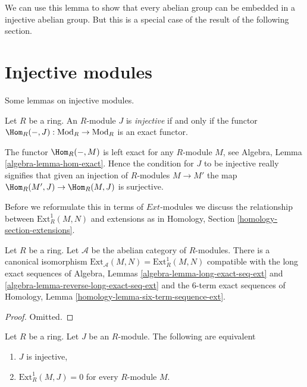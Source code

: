 \noindent
We can use this lemma to show that every abelian
group can be embedded in a injective abelian
group. But this is a special case of the result of
the following section.





\section{Injective modules}
\label{section-injectives-modules}

\noindent
Some lemmas on injective modules.

\begin{definition}
\label{definition-projective}
Let $R$ be a ring. An $R$-module $J$ is {\it injective} if and only if
the functor $\Hom_R(-, J) : \text{Mod}_R \to \text{Mod}_R$ is
an exact functor.
\end{definition}

\noindent
The functor $\Hom_R(- , M)$ is left exact for any $R$-module $M$, see
Algebra, Lemma \ref{algebra-lemma-hom-exact}.
Hence the condition for $J$ to be injective really signifies that given
an injection of $R$-modules $M \to M'$ the map
$\Hom_R(M', J) \to \Hom_R(M, J)$ is surjective.

\medskip\noindent
Before we reformulate this in terms of ${Ext}$-modules we discuss the
relationship between $\text{Ext}^1_R(M, N)$ and extensions as in
Homology, Section \ref{homology-section-extensions}.

\begin{lemma}
\label{lemma-relation-ext-ext}
Let $R$ be a ring. Let $\mathcal{A}$ be the abelian category of
$R$-modules. There is a canonical isomorphism
$\text{Ext}_\mathcal{A}(M, N) = \text{Ext}^1_R(M, N)$
compatible with the long exact sequences of
Algebra, Lemmas \ref{algebra-lemma-long-exact-seq-ext} and
\ref{algebra-lemma-reverse-long-exact-seq-ext}
and the $6$-term exact sequences of
Homology, Lemma \ref{homology-lemma-six-term-sequence-ext}.
\end{lemma}

\begin{proof}
Omitted.
\end{proof}

\begin{lemma}
\label{lemma-characterize-injective}
Let $R$ be a ring. Let $J$ be an $R$-module.
The following are equivalent
\begin{enumerate}
\item $J$ is injective,
\item $\text{Ext}^1_R(M, J) = 0$ for every $R$-module $M$.
\end{enumerate}
\end{lemma}


